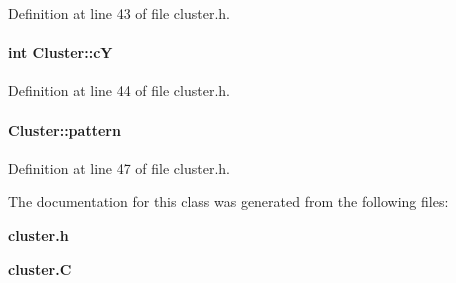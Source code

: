 Definition at line 43 of file cluster.h.\label{Cluster_m1}
\paragraph{\setlength{\rightskip}{0pt plus 5cm}int Cluster::c\-Y}\hfill



Definition at line 44 of file cluster.h.\label{Cluster_m2}
\paragraph{ Cluster::pattern}\hfill



Definition at line 47 of file cluster.h.

The documentation for this class was generated from the following files:\begin{CompactItemize}
\item 
{\bf cluster.h}\item 
{\bf cluster.C}\end{CompactItemize}

